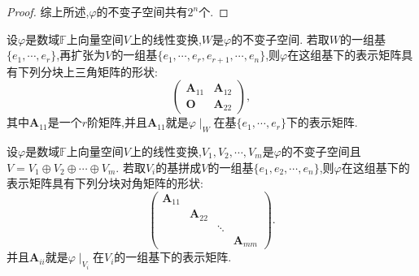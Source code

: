 \documentclass[../../main.tex]{subfiles}%
\begin{document}
\begin{proof}
综上所述,\(\varphi\)的不变子空间共有\(2^n\)个. 
\end{proof}

\begin{theorem}\label{theorem:在不变子空间基下的矩阵}
设\(\varphi\)是数域\(\mathbb{F}\)上向量空间\(V\)上的线性变换,\(W\)是\(\varphi\)的不变子空间. 若取\(W\)的一组基\(\{e_1,\cdots,e_r\}\),再扩张为\(V\)的一组基\(\{e_1,\cdots,e_r,e_{r + 1},\cdots,e_n\}\),则\(\varphi\)在这组基下的表示矩阵具有下列分块上三角矩阵的形状:
\[
\begin{pmatrix}
\boldsymbol{A}_{11}&\boldsymbol{A}_{12}\\
\boldsymbol{O}&\boldsymbol{A}_{22}
\end{pmatrix},
\]
其中\(\boldsymbol{A}_{11}\)是一个\(r\)阶矩阵,并且$\boldsymbol{A}_{11}$就是$\varphi\mid _W$在基$\{e_1,\cdots,e_r\}$下的表示矩阵.
\end{theorem}

\begin{theorem}\label{theorem:在直和的基下的矩阵}
设\(\varphi\)是数域\(\mathbb{F}\)上向量空间\(V\)上的线性变换,\(V_1,V_2,\cdots,V_m\)是\(\varphi\)的不变子空间且\(V = V_1\oplus V_2\oplus\cdots\oplus V_m\). 若取\(V_i\)的基拼成\(V\)的一组基\(\{e_1,e_2,\cdots,e_n\}\),则\(\varphi\)在这组基下的表示矩阵具有下列分块对角矩阵的形状:
\[
\begin{pmatrix}
\boldsymbol{A}_{11}&&&\\
&\boldsymbol{A}_{22}&&\\
&&\ddots&\\
&&&\boldsymbol{A}_{mm}
\end{pmatrix}.
\]
并且$\boldsymbol{A}_{ii}$就是$\varphi\mid_{V_i}$在$V_i$的一组基下的表示矩阵.
\end{theorem}
\end{document}
